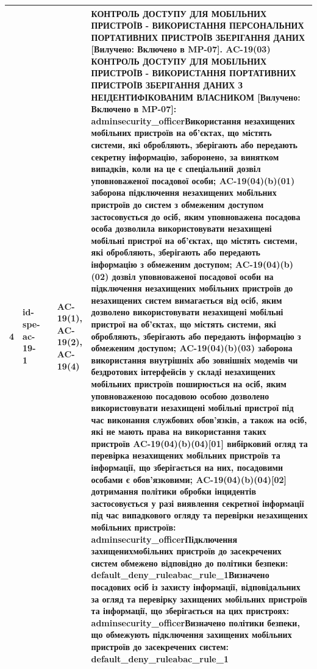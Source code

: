 \documentclass[10pt]{article}
\begin{document}
\begin{longtable}{|c|>{\raggedright\arraybackslash}p{2.5cm}|>{\raggedright\arraybackslash}p{4cm}|>{\raggedright\arraybackslash}p{3.5cm}|>{\raggedright\arraybackslash}p{5.5cm}|}
4 & id-spe-ac-19-1 &  & AC-19(1), AC-19(2), AC-19(4) & КОНТРОЛЬ ДОСТУПУ ДЛЯ МОБІЛЬНИХ ПРИСТРОЇВ - ВИКОРИСТАННЯ ПЕРСОНАЛЬНИХ ПОРТАТИВНИХ ПРИСТРОЇВ ЗБЕРІГАННЯ ДАНИХ [Вилучено: Включено в MP-07]. AC-19(03) КОНТРОЛЬ ДОСТУПУ ДЛЯ МОБІЛЬНИХ ПРИСТРОЇВ - ВИКОРИСТАННЯ ПОРТАТИВНИХ ПРИСТРОЇВ ЗБЕРІГАННЯ ДАНИХ З НЕІДЕНТИФІКОВАНИМ ВЛАСНИКОМ [Вилучено: Включено в MP-07]: \textbf{adminsecurity\_\allowbreak{}officer}\newline Використання незахищених мобільних пристроїв на об'єктах, що містять системи, які обробляють, зберігають або передають секретну інформацію, заборонено, за винятком випадків, коли на це є спеціальний дозвіл уповноваженої посадової особи; AC-19(04)(b)(01) заборона підключення незахищених мобільних пристроїв до систем з обмеженим доступом застосовується до осіб, яким уповноважена посадова особа дозволила використовувати незахищені мобільні пристрої на об'єктах, що містять системи, які обробляють, зберігають або передають інформацію з обмеженим доступом; AC-19(04)(b)(02) дозвіл уповноваженої посадової особи на підключення незахищених мобільних пристроїв до незахищених систем вимагається від осіб, яким дозволено використовувати незахищені мобільні пристрої на об'єктах, що містять системи, які обробляють, зберігають або передають інформацію з обмеженим доступом; AC-19(04)(b)(03) заборона використання внутрішніх або зовнішніх модемів чи бездротових інтерфейсів у складі незахищених мобільних пристроїв поширюється на осіб, яким уповноваженою посадовою особою дозволено використовувати незахищені мобільні пристрої під час виконання службових обов'язків, а також на осіб, які не мають права на використання таких пристроїв AC-19(04)(b)(04)[01] вибірковий огляд та перевірка незахищених мобільних пристроїв та інформації, що зберігається на них, посадовими особами є обов'язковими; AC-19(04)(b)(04)[02] дотримання політики обробки інцидентів застосовується у разі виявлення секретної інформації під час випадкового огляду та перевірки незахищених мобільних пристроїв: \textbf{adminsecurity\_\allowbreak{}officer}\newline Підключення захищенихмобільних пристроїв до засекречених систем обмежено відповідно до політики безпеки: \textbf{default\_\allowbreak{}deny\_\allowbreak{}ruleabac\_\allowbreak{}rule\_\allowbreak{}1}\newline Визначено посадових осіб із захисту інформації, відповідальних за огляд та перевірку захищених мобільних пристроїв та інформації, що зберігається на цих пристроях: \textbf{adminsecurity\_\allowbreak{}officer}\newline Визначено політики безпеки, що обмежують підключення захищених мобільних пристроїв до засекречених систем: \textbf{default\_\allowbreak{}deny\_\allowbreak{}ruleabac\_\allowbreak{}rule\_\allowbreak{}1} \\ \hline

\end{longtable}
\end{document}
